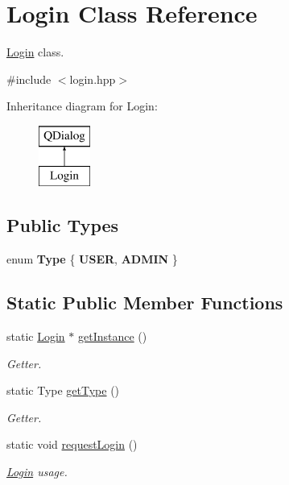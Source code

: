 \hypertarget{classLogin}{\section{Login Class Reference}
\label{classLogin}
}


\hyperlink{classLogin}{Login} class.  




{\ttfamily \#include $<$login.\-hpp$>$}

Inheritance diagram for Login\-:\begin{figure}[H]
\begin{center}
\leavevmode
\includegraphics[height=2.000000cm]{classLogin}
\end{center}
\end{figure}
\subsection*{Public Types}
\begin{DoxyCompactItemize}
\item 
enum {\bfseries Type} \{ {\bfseries U\-S\-E\-R}, 
{\bfseries A\-D\-M\-I\-N}
 \}
\end{DoxyCompactItemize}
\subsection*{Static Public Member Functions}
\begin{DoxyCompactItemize}
\item 
static \hyperlink{classLogin}{Login} $\ast$ \hyperlink{classLogin_a369d9ce9b0debac51fb72a234fd82b03}{get\-Instance} ()
\begin{DoxyCompactList}\small\item\em Getter. \end{DoxyCompactList}\item 
static Type \hyperlink{classLogin_ab23eec7779982cad2ceac3d25ac4aa26}{get\-Type} ()
\begin{DoxyCompactList}\small\item\em Getter. \end{DoxyCompactList}\item 
static void \hyperlink{classLogin_a82b6030d49444a1b60a375983b1798ca}{request\-Login} ()
\begin{DoxyCompactList}\small\item\em \hyperlink{classLogin}{Login} usage. \end{DoxyCompactList}\end{DoxyCompactItemize}


